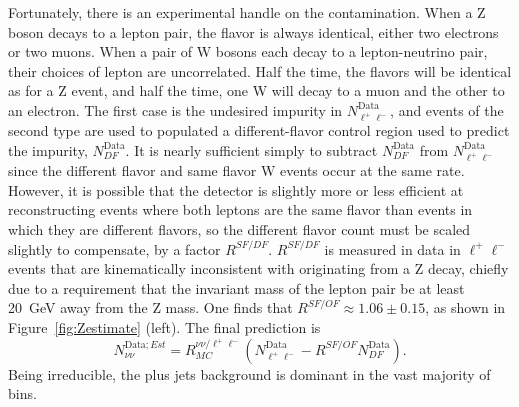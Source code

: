     Fortunately, there is an experimental handle on the contamination.
    When a Z boson decays to a lepton pair, the flavor is always identical, either two electrons or two muons.
    When a pair of W bosons each decay to a lepton-neutrino pair, their choices of lepton are uncorrelated.
    Half the time, the flavors will be identical as for a Z event, and half the time, one W will decay to a muon and the other to an electron.
    The first case is the undesired impurity in $N_{\ell^+\ell^-}^{\mathrm{Data}}$, and events of the second type are used to populated a different-flavor control region used to predict the impurity, $N_{DF}^{\mathrm{Data}}$.
    It is nearly sufficient simply to subtract $N_{DF}^{\mathrm{Data}}$ from $N_{\ell^+\ell^-}^{\mathrm{Data}}$ since the different flavor and same flavor W events occur at the same rate.
    However, it is possible that the detector is slightly more or less efficient at reconstructing events where both leptons are the same flavor than events in which they are different flavors, so the different flavor count must be scaled slightly to compensate, by a factor $R^{SF/DF}$.
    $R^{SF/DF}$ is measured in data in $\ell^+\ell^-$ events that are kinematically inconsistent with originating from a Z decay, chiefly due to a requirement that the invariant mass of the lepton pair be at least 20~GeV away from the Z mass.
    One finds that $R^{SF/OF} \approx 1.06 \pm 0.15$, as shown in Figure~\ref{fig:Zestimate} (left).
    The final prediction is
    \begin{equation}
      N_{\nu\nu}^{\mathrm{Data};Est} = R_{MC}^{\nu\nu/\ell^+\ell^-}(N^{\mathrm{Data}}_{\ell^+\ell^-}-R^{SF/OF}N_{DF}^{\mathrm{Data}}).
    \end{equation}
    Being irreducible, the \znunu plus jets background is dominant in the vast majority of bins.

